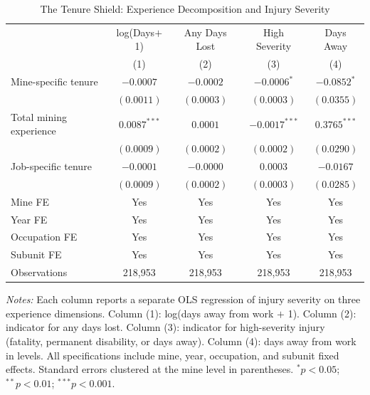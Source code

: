 \begin{table}[t]
\centering
\caption{The Tenure Shield: Experience Decomposition and Injury Severity}
\label{tab:decomposition}
\begin{tabular}{lcccc}
\toprule
 & log(Days$+$1) & Any Days Lost & High Severity & Days Away \\
 & (1) & (2) & (3) & (4) \\
\midrule
Mine-specific tenure & $-0.0007$ & $-0.0002$ & $-0.0006^{*}$ & $-0.0852^{*}$ \\
 & $(0.0011)$ & $(0.0003)$ & $(0.0003)$ & $(0.0355)$ \\
\addlinespace
Total mining experience & $0.0087^{***}$ & $0.0001$ & $-0.0017^{***}$ & $0.3765^{***}$ \\
 & $(0.0009)$ & $(0.0002)$ & $(0.0002)$ & $(0.0290)$ \\
\addlinespace
Job-specific tenure & $-0.0001$ & $-0.0000$ & $0.0003$ & $-0.0167$ \\
 & $(0.0009)$ & $(0.0002)$ & $(0.0003)$ & $(0.0285)$ \\
\midrule
Mine FE & Yes & Yes & Yes & Yes \\
Year FE & Yes & Yes & Yes & Yes \\
Occupation FE & Yes & Yes & Yes & Yes \\
Subunit FE & Yes & Yes & Yes & Yes \\
Observations & 218,953 & 218,953 & 218,953 & 218,953 \\
\bottomrule
\end{tabular}
\begin{tablenotes}[flushleft]
\item \textit{Notes:} Each column reports a separate OLS regression of injury severity on three experience dimensions. Column (1): log(days away from work $+$ 1). Column (2): indicator for any days lost. Column (3): indicator for high-severity injury (fatality, permanent disability, or days away). Column (4): days away from work in levels. All specifications include mine, year, occupation, and subunit fixed effects. Standard errors clustered at the mine level in parentheses. $^{*}p<0.05$; $^{**}p<0.01$; $^{***}p<0.001$.
\end{tablenotes}
\end{table}

